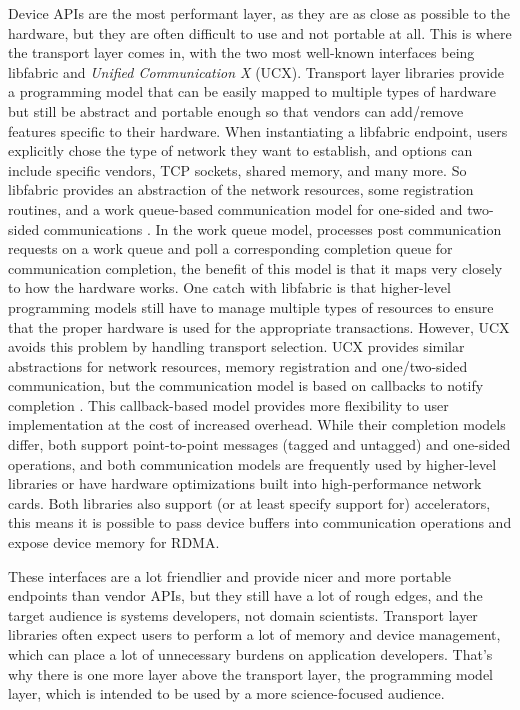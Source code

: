 Device APIs are the most performant layer, as they are as close as possible to the hardware, but they are often difficult to use and not portable at all.
This is where the transport layer comes in, with the two most well-known interfaces being libfabric and \textit{Unified Communication X} (UCX).
Transport layer libraries provide a programming model that can be easily mapped to multiple types of hardware but still be abstract and portable enough so that vendors can add/remove features specific to their hardware.
When instantiating a libfabric endpoint, users explicitly chose the type of network they want to establish, and options can include specific vendors, TCP sockets, shared memory, and many more.
So libfabric provides an abstraction of the network resources, some registration routines, and a work queue-based communication model for one-sided and two-sided communications \cite{libfabric}.
In the work queue model, processes post communication requests on a work queue and poll a corresponding completion queue for communication completion, the benefit of this model is that it maps very closely to how the hardware works.
One catch with libfabric is that higher-level programming models still have to manage multiple types of resources to ensure that the proper hardware is used for the appropriate transactions. 
However, UCX avoids this problem by handling transport selection.
UCX provides similar abstractions for network resources, memory registration and one/two-sided communication, but the communication model is based on callbacks to notify completion \cite{shamis2015ucx}.
This callback-based model provides more flexibility to user implementation at the cost of increased overhead.
While their completion models differ, both support point-to-point messages (tagged and untagged) and one-sided operations, and both communication models are frequently used by higher-level libraries or have hardware optimizations built into high-performance network cards.
Both libraries also support (or at least specify support for) accelerators, this means it is possible to pass device buffers into communication operations and expose device memory for RDMA.

These interfaces are a lot friendlier and provide nicer and more portable endpoints than vendor APIs, but they still have a lot of rough edges, and the target audience is systems developers, not domain scientists.
Transport layer libraries often expect users to perform a lot of memory and device management, which can place a lot of unnecessary burdens on application developers.
That's why there is one more layer above the transport layer, the programming model layer, which is intended to be used by a more science-focused audience.

